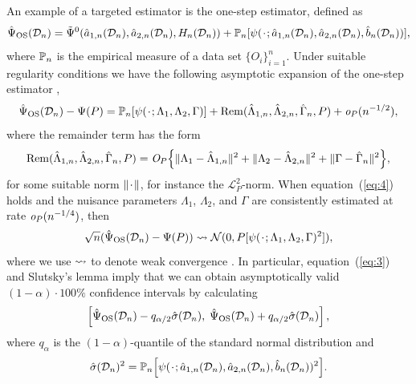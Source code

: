 An example of a targeted estimator is the one-step estimator, defined as
\begin{equation}
    \label{eq:one-step-def}
    \hat{\Psi}_{\text{OS}}(\data_n)
    =
    \tilde{\Psi}^0(\hat{a}_{1,n}(\data_n), \hat{a}_{2,n}(\data_n),
    H_n(\data_n))
    + \empmeas{[\psi(\blank; \hat{a}_{1,n}(\data_n), \hat{a}_{2,n}(\data_n),
      \hat{b}_n(\data_n) )]},
\end{equation}
where \( \mathbb{P}_n \) is the empirical measure of a data set
\(\{O_i\}_{i=1}^n\).
Under suitable regularity conditions
we have the
following asymptotic expansion of the one-step estimator
\citep{pfanzagl1985contributions,van2003unified,fisher2021visually,kennedy2022semiparametric},
\begin{equation*}
  \hat{\Psi}_{\text{OS}}(\data_n)- \Psi(P)
  =  \empmeas{[\psi(\blank ; \Lambda_1, \Lambda_2, \Gamma)]}
  +\mathrm{Rem}{(\hat{\Lambda}_{1,n},\hat{\Lambda}_{2,n},  \hat{\Gamma}_n, P)} + \smallO_{P}(n^{-1/2}),
\end{equation*}
where the remainder term has the form
\begin{equation}
  \label{eq:4}
  \mathrm{Rem}{(\hat{\Lambda}_{1,n},\hat{\Lambda}_{2,n},  \hat{\Gamma}_n, P)}
  = \textit{O}_P{
    \left\{
      \|\Lambda_1-\hat{\Lambda}_{1,n}\|^2
      +
      \|\Lambda_2-\hat{\Lambda}_{2,n}\|^2
      +
      \|\Gamma-\hat{\Gamma}_{n}\|^2
    \right\}
  },
\end{equation}
for some suitable norm \( \|\blank \| \), for instance the
\( \mathcal{L}_{P}^2 \)-norm. When equation~(\ref{eq:4}) holds and the
nuisance parameters $\Lambda_1$, $\Lambda_2$, and $\Gamma$ are
consistently estimated at rate \( \textit{o}_P{(n^{-1/4})} \), then
\begin{equation}
  \label{eq:3}
  \sqrt{n}(\hat{\Psi}_{\text{OS}}(\data_n)- \Psi(P)) \weakly \mathcal{N}(0,
  P{[\psi(\blank; \Lambda_1, \Lambda_2, \Gamma)^2]}),
\end{equation}
where we use \( \rightsquigarrow \) to denote weak convergence \citep{van2000asymptotic}.
In particular, equation~(\ref{eq:3}) and Slutsky's lemma imply that we can
obtain asymptotically valid \((1-\alpha)\cdot100\%\) confidence intervals by
calculating
\begin{equation*}
  \left[
    \hat{\Psi}_{\text{OS}}(\mathcal{D}_n) - q_{\alpha/2} \hat{\sigma}(\mathcal{D}_n) ,
    \;
    \hat{\Psi}_{\text{OS}}(\mathcal{D}_n) + q_{\alpha/2} \hat{\sigma}(\mathcal{D}_n)
  \right],
\end{equation*}
where \( q_{\alpha} \) is the \( (1-\alpha) \)-quantile of the standard normal
distribution and
\begin{equation*}
  \hat{\sigma}(\data_n)^2 = \empmeas{ \left[ \psi(\blank;
      \hat{a}_{1,n}(\data_n), \hat{a}_{2,n}(\data_n), \hat{b}_n(\data_n))^2
    \right]}.
\end{equation*}



